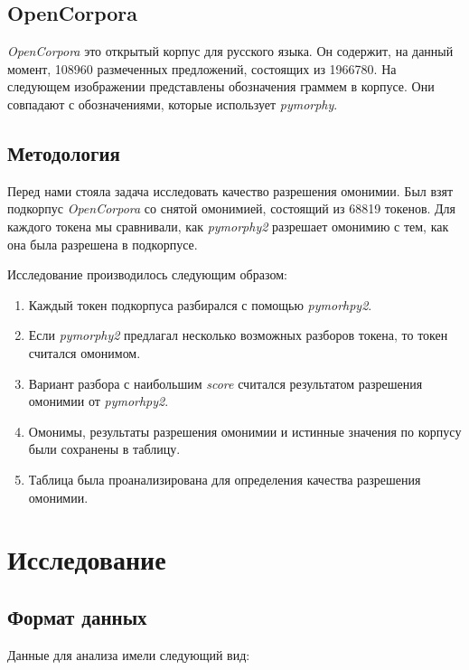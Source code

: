 \documentclass[a4paper,14pt]{article}
\begin{document}
	\subsection{OpenCorpora}
	\textit{OpenCorpora} это открытый корпус для русского языка. Он содержит, на данный момент, 108960 размеченных предложений, состоящих из 1966780. 
	На следующем изображении представлены обозначения граммем в корпусе. Они совпадают с обозначениями, которые использует \textit{pymorphy}.
	    \begin{center}
	    \end{center}

	\subsection{Методология}
	Перед нами стояла задача исследовать качество разрешения омонимии. Был взят подкорпус \textit{OpenCorpora} со снятой омонимией, состоящий из 68819 токенов. Для каждого токена мы сравнивали, как \textit{pymorphy2} разрешает омонимию с тем, как она была разрешена в подкорпусе.


	Исследование производилось следующим образом:
	\begin{enumerate}
  		\item Каждый токен подкорпуса разбирался с помощью \textit{pymorhpy2}.
  		\item Если \textit{pymorphy2} предлагал несколько возможных разборов токена, то токен считался омонимом.
		\item Вариант разбора с наибольшим \textit{score} считался результатом разрешения омонимии от \textit{pymorhpy2}.
		\item Омонимы, результаты разрешения омонимии и истинные значения по корпусу были сохранены в таблицу.
		\item Таблица была проанализирована для определения качества разрешения омонимии.
	\end{enumerate}

	\section{Исследование}

	\subsection{Формат данных}
	Данные для анализа имели следующий вид:
\end{document}
